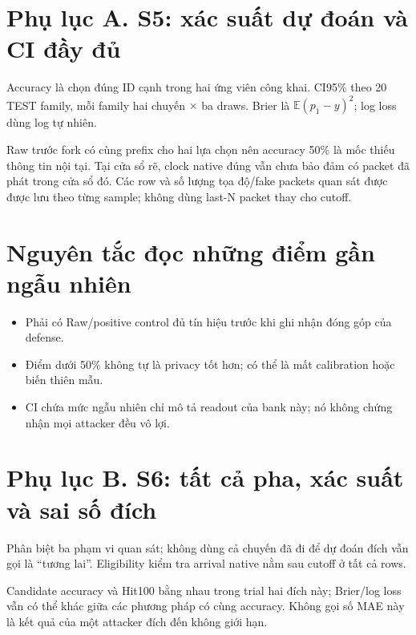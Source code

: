 \documentclass[10pt,a4paper]{article}
\begin{document}
\clearpage
\section*{Phụ lục A. S5: xác suất dự đoán và CI đầy đủ}
Accuracy là chọn đúng ID cạnh trong hai ứng viên công khai. CI95\% theo 20 TEST family, mỗi family
hai chuyến $\times$ ba draws. Brier là $\mathbb E(p_1-y)^2$; log loss dùng log tự nhiên.
\begin{small}\end{small}
Raw trước fork có cùng prefix cho hai lựa chọn nên accuracy 50\% là mốc thiếu thông tin nội tại.
Tại cửa sổ rẽ, clock native đúng vẫn chưa bảo đảm có packet đã phát trong cửa sổ đó. Các row và số lượng
tọa độ/fake packets quan sát được được lưu theo từng sample; không dùng last-N packet thay cho cutoff.

\section*{Nguyên tắc đọc những điểm gần ngẫu nhiên}
\begin{itemize}
\item Phải có Raw/positive control đủ tín hiệu trước khi ghi nhận đóng góp của defense.
\item Điểm dưới 50\% không tự là privacy tốt hơn; có thể là mất calibration hoặc biến thiên mẫu.
\item CI chứa mức ngẫu nhiên chỉ mô tả readout của bank này; nó không chứng nhận mọi attacker đều vô lợi.
\end{itemize}

\clearpage
\section*{Phụ lục B. S6: tất cả pha, xác suất và sai số đích}
Phân biệt ba phạm vi quan sát; không dùng cả chuyến đã đi để dự đoán đích vẫn gọi là ``tương lai''.
Eligibility kiểm tra arrival native nằm sau cutoff ở tất cả rows.
\begin{footnotesize}\end{footnotesize}
Candidate accuracy và Hit100 bằng nhau trong trial hai đích này; Brier/log loss vẫn có thể khác giữa
các phương pháp có cùng accuracy. Không gọi số MAE này là kết quả của một attacker đích đến không giới hạn.
\end{document}
